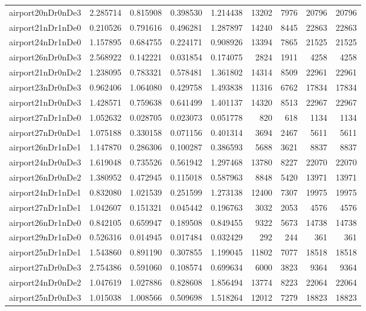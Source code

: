 \begin{longtable}{|l|r|r|r|r|r|r|r|r|}
airport20nDr0nDe3 & 2.285714 & 0.815908 & 0.398530 & 1.214438 & 13202 & 7976 & 20796 & 20796 \\
airport21nDr1nDe0 & 0.210526 & 0.791616 & 0.496281 & 1.287897 & 14240 & 8445 & 22863 & 22863 \\
airport24nDr1nDe0 & 1.157895 & 0.684755 & 0.224171 & 0.908926 & 13394 & 7865 & 21525 & 21525 \\
airport26nDr0nDe3 & 2.568922 & 0.142221 & 0.031854 & 0.174075 & 2824 & 1911 & 4258 & 4258 \\
airport21nDr0nDe2 & 1.238095 & 0.783321 & 0.578481 & 1.361802 & 14314 & 8509 & 22961 & 22961 \\
airport23nDr0nDe3 & 0.962406 & 1.064080 & 0.429758 & 1.493838 & 11316 & 6762 & 17834 & 17834 \\
airport21nDr0nDe3 & 1.428571 & 0.759638 & 0.641499 & 1.401137 & 14320 & 8513 & 22967 & 22967 \\
airport27nDr1nDe0 & 1.052632 & 0.028705 & 0.023073 & 0.051778 & 820 & 618 & 1134 & 1134 \\
airport27nDr0nDe1 & 1.075188 & 0.330158 & 0.071156 & 0.401314 & 3694 & 2467 & 5611 & 5611 \\
airport26nDr1nDe1 & 1.147870 & 0.286306 & 0.100287 & 0.386593 & 5688 & 3621 & 8837 & 8837 \\
airport24nDr0nDe3 & 1.619048 & 0.735526 & 0.561942 & 1.297468 & 13780 & 8227 & 22070 & 22070 \\
airport26nDr0nDe2 & 1.380952 & 0.472945 & 0.115018 & 0.587963 & 8848 & 5420 & 13971 & 13971 \\
airport24nDr1nDe1 & 0.832080 & 1.021539 & 0.251599 & 1.273138 & 12400 & 7307 & 19975 & 19975 \\
airport27nDr1nDe1 & 1.042607 & 0.151321 & 0.045442 & 0.196763 & 3032 & 2053 & 4576 & 4576 \\
airport26nDr1nDe0 & 0.842105 & 0.659947 & 0.189508 & 0.849455 & 9322 & 5673 & 14738 & 14738 \\
airport29nDr1nDe0 & 0.526316 & 0.014945 & 0.017484 & 0.032429 & 292 & 244 & 361 & 361 \\
airport25nDr1nDe1 & 1.543860 & 0.891190 & 0.307855 & 1.199045 & 11802 & 7077 & 18518 & 18518 \\
airport27nDr0nDe3 & 2.754386 & 0.591060 & 0.108574 & 0.699634 & 6000 & 3823 & 9364 & 9364 \\
airport24nDr0nDe2 & 1.047619 & 1.027886 & 0.828608 & 1.856494 & 13774 & 8223 & 22064 & 22064 \\
airport25nDr0nDe3 & 1.015038 & 1.008566 & 0.509698 & 1.518264 & 12012 & 7279 & 18823 & 18823 \\

\end{longtable}
